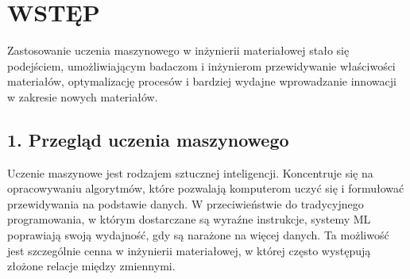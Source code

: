 

{}
\fontsize{14}{16}\selectfont
\setlength{\parindent}{0pt}
\chapter*{WSTĘP} 
\fontsize{12}{14}\selectfont
\vspace{\baselineskip} 

{}
\vspace{-1.0em}
Zastosowanie uczenia maszynowego w inżynierii materiałowej stało się podejściem, umożliwiającym badaczom i inżynierom przewidywanie właściwości materiałów, optymalizację procesów i bardziej wydajne wprowadzanie innowacji w zakresie nowych materiałów. 





{}
\section*{1. Przegląd uczenia maszynowego}
\vspace{-1.0em}
Uczenie maszynowe jest rodzajem sztucznej inteligencji. 
Koncentruje się na opracowywaniu algorytmów, które pozwalają komputerom uczyć się i formułować przewidywania na podstawie danych. 
W przeciwieństwie do tradycyjnego programowania, w którym dostarczane są wyraźne instrukcje, systemy ML poprawiają swoją wydajność, gdy są narażone na więcej danych. 
Ta możliwość jest szczególnie cenna w inżynierii materiałowej, w której często występują złożone relacje między zmiennymi.

